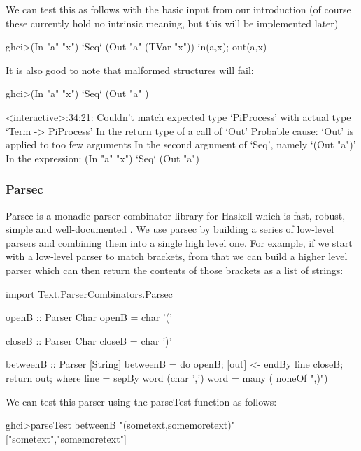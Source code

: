 

We can test this as follows with the basic input from our introduction (of course these currently hold no intrinsic meaning, but this will be implemented later)

\begin{code}
    ghci>(In "a" "x") `Seq` (Out "a" (TVar "x"))
    in(a,x);
    out(a,x)
\end{code}

It is also good to note that malformed structures will fail:

\begin{code}
    ghci>(In "a" "x") `Seq` (Out "a" )

    <interactive>:34:21:
        Couldn't match expected type `PiProcess'
        with actual type `Term -> PiProcess'
        In the return type of a call of `Out'
        Probable cause: `Out' is applied to too few arguments
        In the second argument of `Seq', namely `(Out "a")'
        In the expression: (In "a" "x") `Seq` (Out "a")
                                        
\end{code}

\subsubsection{Parsec}

Parsec is a monadic parser combinator library for Haskell which is fast, robust, simple and well-documented \cite{lm01}. We use parsec by building a series of low-level parsers and combining them into a single high level one.
For example, if we start with a low-level parser to match brackets, from that we can build a higher level parser which can then return the contents of those brackets as a list of strings:
\begin{code}
import Text.ParserCombinators.Parsec

openB :: Parser Char
openB = char '(' 

closeB :: Parser Char
closeB = char ')' 

betweenB :: Parser [String]
betweenB = do{
            openB;
            [out] <- endBy line closeB;
            return out;
        } 
    where
        line = sepBy word (char ',')
        word = many ( noneOf ",)")
\end{code}

We can test this parser using the parseTest function as follows:

\begin{code}
    ghci>parseTest betweenB "(sometext,somemoretext)"
    ["sometext","somemoretext"]
\end{code}

